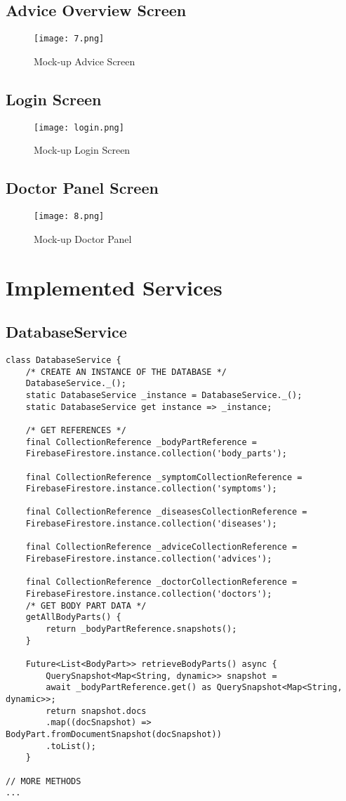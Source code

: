 \section{Advice Overview Screen}
\begin{figure}[H]
	\centering
	\texttt{[image: 7.png]}
	\caption{Mock-up Advice Screen}
\end{figure}
\pagebreak
\section{Login Screen}
\begin{figure}[H]
	\centering
	\texttt{[image: login.png]}
	\caption{Mock-up Login Screen}
\end{figure}
\pagebreak
\section{Doctor Panel Screen}
\begin{figure}[H]
	\centering
	\texttt{[image: 8.png]}
	\caption{Mock-up Doctor Panel}
\end{figure}




\chapter{Implemented Services}
\section{DatabaseService}
\begin{lstlisting}[caption=DatabaseService Code]
class DatabaseService {
	/* CREATE AN INSTANCE OF THE DATABASE */
	DatabaseService._();
	static DatabaseService _instance = DatabaseService._();
	static DatabaseService get instance => _instance;
	
	/* GET REFERENCES */
	final CollectionReference _bodyPartReference =
	FirebaseFirestore.instance.collection('body_parts');
	
	final CollectionReference _symptomCollectionReference =
	FirebaseFirestore.instance.collection('symptoms');
	
	final CollectionReference _diseasesCollectionReference =
	FirebaseFirestore.instance.collection('diseases');
	
	final CollectionReference _adviceCollectionReference =
	FirebaseFirestore.instance.collection('advices');
	
	final CollectionReference _doctorCollectionReference =
	FirebaseFirestore.instance.collection('doctors');
	/* GET BODY PART DATA */
	getAllBodyParts() {
		return _bodyPartReference.snapshots();
	}
	
	Future<List<BodyPart>> retrieveBodyParts() async {
		QuerySnapshot<Map<String, dynamic>> snapshot =
		await _bodyPartReference.get() as QuerySnapshot<Map<String, dynamic>>;
		return snapshot.docs
		.map((docSnapshot) => BodyPart.fromDocumentSnapshot(docSnapshot))
		.toList();
	}

// MORE METHODS 
...
\end{lstlisting}
\pagebreak
